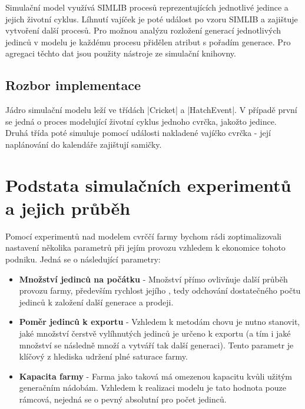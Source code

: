 \documentclass[11pt, a4paper, titlepage]{article}
\makeatletter
\newcommand\ic[1][green]{%
\@testopt{\@ic{#1}}{-#1}%
}
\def\@ic#1[#2]{%
\Collectverb{\@@ic{#1}{#2}}%
}
\def\@@ic#1#2#3{%
{\lstinline[basicstyle=\ttfamily\color{codeprimary},breaklines=true]|#3|}%
}
\makeatother
\begin{document}
    Simulační model využívá SIMLIB procesů reprezentujících jednotlivé jedince a jejich životní cyklus. Líhnutí vajíček
    je poté událost po vzoru SIMLIB a zajištuje vytvoření další procesů. Pro možnou analýzu rozložení generací
    jednotlivých jedinců v modelu je každému procesu přidělen atribut s pořadím generace. Pro agregaci těchto dat jsou
    použity nástroje ze simulační knihovny.

    \subsection{Rozbor implementace}

    Jádro simulační modelu leží ve třídách \ic|Cricket| a \ic|HatchEvent|. V případě první se jedná o proces modelující
    životní cyklus jednoho cvrčka, jakožto jedince. Druhá třída poté simuluje pomocí události nakladené vajíčko cvrčka -
    její naplánování do kalendáře zajištují samičky.

    \section{Podstata simulačních experimentů a jejich průběh}

    Pomocí experimentů nad modelem cvrččí farmy bychom rádi zoptimalizovali nastavení několika parametrů při jejím provozu
    vzhledem k ekonomice tohoto podniku. Jedná se o následující parametry:

    \begin{itemize}
        \item \textbf{Množství jedinců na počátku} - Množství přímo ovlivňuje další průběh provozu farmy, především rychlost
        jejího , tedy odchování dostatečného počtu jedinců k založení další generace a prodeji.

        \item \textbf{Poměr jedinců k exportu} - Vzhledem k metodám chovu je nutno stanovit, jaké množství čerstvě
        vylíhnutých jedinců je určeno k exportu (a tím i jaké množství se následně množí a vytváří tak další generaci).
        Tento parametr je klíčový z hlediska udržení plné saturace farmy.

        \item \textbf{Kapacita farmy} - Farma jako taková má omezenou kapacitu kvůli užitým generačním nádobám. Vzhledem
        k realizaci modelu je tato hodnota pouze rámcová, nejedná se o pevný absolutní  pro počet jedinců.
    \end{itemize}
\end{document}

